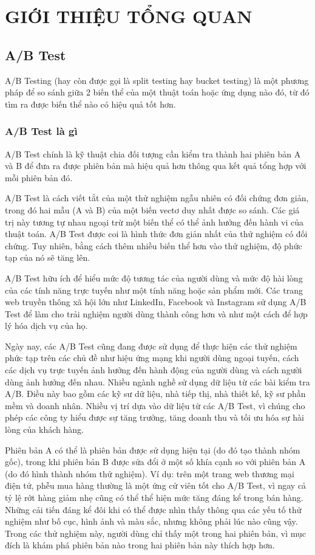 \chapter{GIỚI THIỆU TỔNG QUAN}

\section{A/B Test}

A/B Testing (hay còn được gọi là split testing hay bucket testing) là một phương pháp để so sánh giữa 2 biến thể của một thuật toán hoặc ứng dụng nào đó, từ đó tìm ra được biến thể nào có hiệu quả tốt hơn.

\subsection{A/B Test là gì}

A/B Test chính là kỹ thuật chia đối tượng cần kiểm tra thành hai phiên bản A và B để đưa ra được phiên bản mà hiệu quả hơn thông qua kết quả tổng hợp với mỗi phiên bản đó.

A/B Test là cách viết tắt của một thử nghiệm ngẫu nhiên có đối chứng đơn giản, trong đó hai mẫu (A và B) của một biến vectơ duy nhất được so sánh. Các giá trị này tương tự nhau ngoại trừ một biến thể có thể ảnh hưởng đến hành vi của thuật toán. A/B Test được coi là hình thức đơn giản nhất của thử nghiệm có đối chứng. Tuy nhiên, bằng cách thêm nhiều biến thể hơn vào thử nghiệm, độ phức tạp của nó sẽ tăng lên.

A/B Test hữu ích để hiểu mức độ tương tác của người dùng và mức độ hài lòng của các tính năng trực tuyến như một tính năng hoặc sản phẩm mới. Các trang web truyền thông xã hội lớn như LinkedIn, Facebook và Instagram sử dụng A/B Test để làm cho trải nghiệm người dùng thành công hơn và như một cách để hợp lý hóa dịch vụ của họ.

Ngày nay, các A/B Test cũng đang được sử dụng để thực hiện các thử nghiệm phức tạp trên các chủ đề như hiệu ứng mạng khi người dùng ngoại tuyến, cách các dịch vụ trực tuyến ảnh hưởng đến hành động của người dùng và cách người dùng ảnh hưởng đến nhau. Nhiều ngành nghề sử dụng dữ liệu từ các bài kiểm tra A/B. Điều này bao gồm các kỹ sư dữ liệu, nhà tiếp thị, nhà thiết kế, kỹ sư phần mềm và doanh nhân. Nhiều vị trí dựa vào dữ liệu từ các A/B Test, vì chúng cho phép các công ty hiểu được sự tăng trưởng, tăng doanh thu và tối ưu hóa sự hài lòng của khách hàng.

Phiên bản A có thể là phiên bản được sử dụng hiện tại (do đó tạo thành nhóm gốc), trong khi phiên bản B được sửa đổi ở một số khía cạnh so với phiên bản A (do đó hình thành nhóm thử nghiệm). Ví dụ: trên một trang web thương mại điện tử, phễu mua hàng thường là một ứng cử viên tốt cho A/B Test, vì ngay cả tỷ lệ rớt hàng giảm nhẹ cũng có thể thể hiện mức tăng đáng kể trong bán hàng. Những cải tiến đáng kể đôi khi có thể được nhìn thấy thông qua các yếu tố thử nghiệm như bố cục, hình ảnh và màu sắc, nhưng không phải lúc nào cũng vậy. Trong các thử nghiệm này, người dùng chỉ thấy một trong hai phiên bản, vì mục đích là khám phá phiên bản nào trong hai phiên bản này thích hợp hơn.

